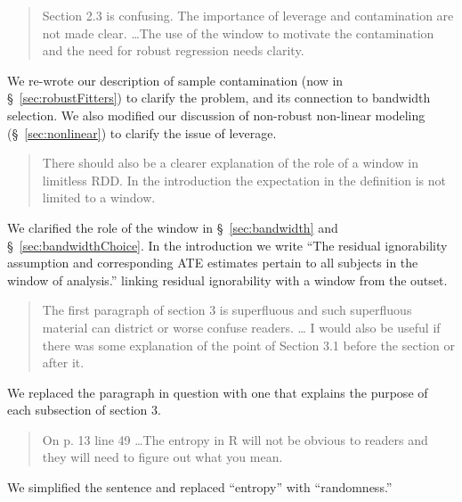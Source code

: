 \documentclass[12pt]{article}
\begin{document}

\begin{quote}
Section 2.3 is confusing. The importance of leverage and contamination
are not made clear. \dots The use of the window to motivate
the contamination and the need for robust regression needs clarity.
\end{quote}
We re-wrote our description of sample contamination (now in
\S~\ref{sec:robustFitters}) to clarify the problem, and its connection
to bandwidth selection.
We also modified our discussion of non-robust non-linear modeling
(\S~\ref{sec:nonlinear}) to clarify the issue of leverage.


\begin{quote}
There should also be a clearer explanation of the role of a window in
limitless RDD. In the introduction the expectation in the definition
is not limited to a window.
\end{quote}
We clarified the role of the window in
\S~\ref{sec:bandwidth} and \S~\ref{sec:bandwidthChoice}. In the
introduction we write ``The residual ignorability assumption and corresponding ATE
estimates pertain to all subjects in the window of analysis.'' linking
residual ignorability with a window from the outset.

\begin{quote}
The first paragraph of section 3 is superfluous and such superfluous
material can district or worse confuse readers. \dots
I would also be useful if there
was some explanation of the point of Section 3.1 before the section or
after it.
\end{quote}
We replaced the paragraph in question with one that explains the
purpose of each subsection of section 3.

\begin{quote}
On p. 13 line 49 \dots The entropy in R will not be obvious to readers and they
will need to figure out what you mean.
\end{quote}
We simplified the sentence and replaced ``entropy'' with
``randomness.''
\end{document}
